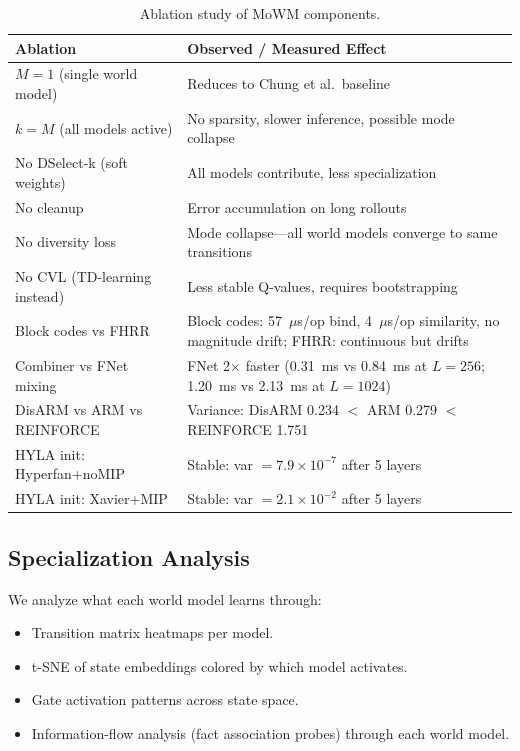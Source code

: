 \documentclass[journal]{IEEEtai}
\begin{document}
\begin{table}[t]
\centering
\caption{Ablation study of MoWM components.}
\label{tab:ablation}
\begin{tabular}{ll}
\toprule
Ablation & Observed / Measured Effect \\
\midrule
$M=1$ (single world model) & Reduces to Chung et al.\ baseline \\
$k=M$ (all models active) & No sparsity, slower inference, possible mode collapse \\
No DSelect-k (soft weights) & All models contribute, less specialization \\
No cleanup & Error accumulation on long rollouts \\
No diversity loss & Mode collapse---all world models converge to same transitions \\
No CVL (TD-learning instead) & Less stable Q-values, requires bootstrapping \\
Block codes vs FHRR & Block codes: 57~$\mu$s/op bind, 4~$\mu$s/op similarity, no magnitude drift; FHRR: continuous but drifts \\
Combiner vs FNet mixing & FNet 2$\times$ faster (0.31~ms vs 0.84~ms at $L{=}256$; 1.20~ms vs 2.13~ms at $L{=}1024$) \\
DisARM vs ARM vs REINFORCE & Variance: DisARM 0.234 $<$ ARM 0.279 $<$ REINFORCE 1.751 \\
HYLA init: Hyperfan+noMIP & Stable: var $= 7.9 \times 10^{-7}$ after 5 layers \\
HYLA init: Xavier+MIP & Stable: var $= 2.1 \times 10^{-2}$ after 5 layers \\
\bottomrule
\end{tabular}
\end{table}

\subsection{Specialization Analysis}

We analyze what each world model learns through:
\begin{itemize}
\item Transition matrix heatmaps per model.
\item t-SNE of state embeddings colored by which model activates.
\item Gate activation patterns across state space.
\item Information-flow analysis (fact association probes) through each world model.
\end{itemize}
\end{document}
